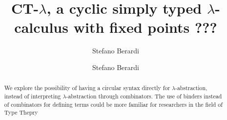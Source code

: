 \ifdraft

\title{CT-$\lambda$, a cyclic simply typed $\lambda$-calculus with fixed points}

\author{Stefano Berardi }
\date{}

\else

\title[Equivalence]
{
???
}

\author[S. Berardi]{Stefano Berardi}
\address{Universit\`{a} di Torino,
Torino, Italy}


\fi

\maketitle

\begin{abstract}
We explore the possibility of having a circular syntax
directly for $\lambda$-abstraction, instead of interpreting
 $\lambda$-abstraction through combinators. 
The use of binders instead of combinators for defining terms 
could be more familiar for researchers in the field of Type Thepry
\end{abstract}

\iffalse
key words: 
proof theory,
inductive definitions,
Brotherston-Simpson conjecture,
cyclic proofs,
Martin-Lof's system of inductive definitions,
infinite Ramsey theorem
Podelski-Rybalchenko termination theorem
size-change termination theorem
\fi